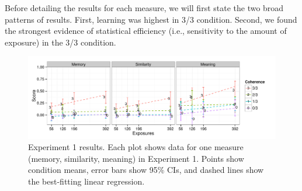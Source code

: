 \documentclass[man,floatsintext]{apa6}
\begin{document}
Before detailing the results for each measure, we will first state the two broad patterns of results. First, learning was highest in 3/3 condition. Second, we found the strongest evidence of statistical efficiency (i.e., sensitivity to the amount of exposure) in the 3/3 condition.

\begin{figure}[t]
  \begin{center}
    \includegraphics[width=1.0\linewidth]{x1.pdf}
    \caption{Experiment 1 results. Each plot shows data for one
measure (memory, similarity, meaning) in Experiment 1. Points show
condition means, error bars show 95\% CIs, and dashed lines show the
best-fitting linear regression.}
    \label{expt1-results}
  \end{center}
\end{figure}

\newcommand{\ww}{\color{white}{*}} \newcommand\T{\rule{0pt}{2.1ex}}
\end{document}
